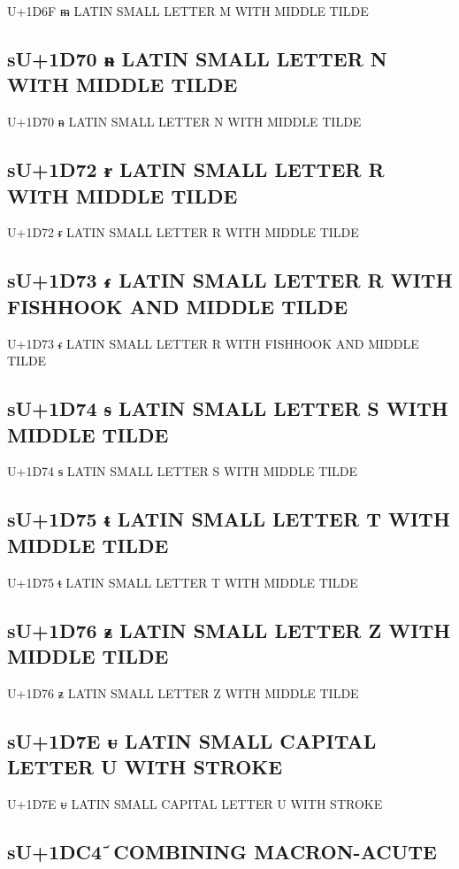 U+1D6F ᵯ LATIN SMALL LETTER M WITH MIDDLE TILDE

\subsection{sU+1D70 ᵰ LATIN SMALL LETTER N WITH MIDDLE TILDE}

U+1D70 ᵰ LATIN SMALL LETTER N WITH MIDDLE TILDE

\subsection{sU+1D72 ᵲ LATIN SMALL LETTER R WITH MIDDLE TILDE}

U+1D72 ᵲ LATIN SMALL LETTER R WITH MIDDLE TILDE

\subsection{sU+1D73 ᵳ LATIN SMALL LETTER R WITH FISHHOOK AND MIDDLE TILDE}

U+1D73 ᵳ LATIN SMALL LETTER R WITH FISHHOOK AND MIDDLE TILDE

\subsection{sU+1D74 ᵴ LATIN SMALL LETTER S WITH MIDDLE TILDE}

U+1D74 ᵴ LATIN SMALL LETTER S WITH MIDDLE TILDE

\subsection{sU+1D75 ᵵ LATIN SMALL LETTER T WITH MIDDLE TILDE}

U+1D75 ᵵ LATIN SMALL LETTER T WITH MIDDLE TILDE

\subsection{sU+1D76 ᵶ LATIN SMALL LETTER Z WITH MIDDLE TILDE}

U+1D76 ᵶ LATIN SMALL LETTER Z WITH MIDDLE TILDE

\subsection{sU+1D7E ᵾ LATIN SMALL CAPITAL LETTER U WITH STROKE}

U+1D7E ᵾ LATIN SMALL CAPITAL LETTER U WITH STROKE

\subsection{sU+1DC4 ᷄ COMBINING MACRON-ACUTE}


